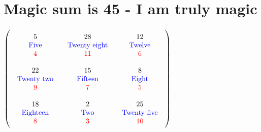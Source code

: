 \documentclass{article}
\begin{document}
\vspace{2em} 
\section{Magic sum is 45 - I am truly magic}$ \left( \begin{array}{ccc}
\begin{array}{c}
\rule{0pt}{1.5em}5 \\ 
\text{\color{blue}Five} \\ 
\color{red}4 \vspace{.5em} 
\end{array} & \begin{array}{c}
\rule{0pt}{1.5em}28 \\ 
\text{\color{blue}Twenty eight} \\ 
\color{red}11 \vspace{.5em} 
\end{array} & \begin{array}{c}
\rule{0pt}{1.5em}12 \\ 
\text{\color{blue}Twelve} \\ 
\color{red}6 \vspace{.5em} 
\end{array}\\ 
\begin{array}{c}
\rule{0pt}{1.5em}22 \\ 
\text{\color{blue}Twenty two} \\ 
\color{red}9 \vspace{.5em} 
\end{array} & \begin{array}{c}
\rule{0pt}{1.5em}15 \\ 
\text{\color{blue}Fifteen} \\ 
\color{red}7 \vspace{.5em} 
\end{array} & \begin{array}{c}
\rule{0pt}{1.5em}8 \\ 
\text{\color{blue}Eight} \\ 
\color{red}5 \vspace{.5em} 
\end{array}\\ 
\begin{array}{c}
\rule{0pt}{1.5em}18 \\ 
\text{\color{blue}Eighteen} \\ 
\color{red}8 \vspace{.5em} 
\end{array} & \begin{array}{c}
\rule{0pt}{1.5em}2 \\ 
\text{\color{blue}Two} \\ 
\color{red}3 \vspace{.5em} 
\end{array} & \begin{array}{c}
\rule{0pt}{1.5em}25 \\ 
\text{\color{blue}Twenty five} \\ 
\color{red}10 \vspace{.5em} 
\end{array}\end{array} \right) $
\end{document}

